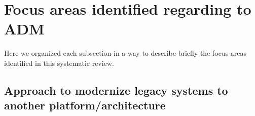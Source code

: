 
\section{Focus areas identified regarding to ADM}

Here we organized each subsection in a way to describe briefly the focus areas identified in this systematic review.

\subsection{Approach to modernize legacy systems to another platform/architecture} %
\label{ssub:approach}

